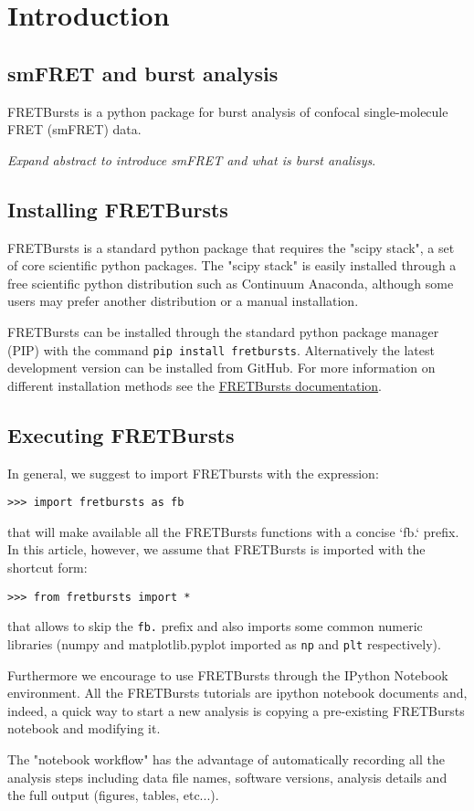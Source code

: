 \section{Introduction}

\subsection{smFRET and burst analysis}

FRETBursts is a python package for burst analysis of confocal single-molecule FRET 
(smFRET) data.

\textit{Expand abstract to introduce smFRET and what is burst analisys}.

\subsection{Installing FRETBursts}
FRETBursts is a standard python package that requires the "scipy stack", a set of core 
scientific python packages.
The "scipy stack" is easily installed through a free scientific python distribution such as Continuum Anaconda, although some users may prefer another distribution or a manual installation.

FRETBursts can be installed through the standard python package manager (PIP) with 
the command \texttt{pip install fretbursts}. Alternatively the latest development version can be installed from GitHub.
For more information on different installation methods see the \href{http://fretbursts.readthedocs.org/en/latest/installation.html}{FRETBursts documentation}.

\subsection{Executing FRETBursts}
In general, we suggest to import FRETbursts with the expression:

\begin{verbatim}
>>> import fretbursts as fb
\end{verbatim}

that will make available all the FRETBursts functions with a concise `fb.` prefix. In this article, however, we assume that FRETBursts is imported with the shortcut form:

\begin{verbatim}
>>> from fretbursts import *
\end{verbatim}

that allows to skip the \verb|fb.| prefix and also imports some common numeric libraries (numpy and matplotlib.pyplot imported as \verb|np| and \verb|plt| respectively).

Furthermore we encourage to use FRETBursts through the IPython Notebook environment. All the FRETBursts tutorials are ipython notebook documents and, indeed, a quick way to start a new analysis is copying a pre-existing FRETBursts notebook and modifying it.

The "notebook workflow"\cite{Shen_2014} has the advantage of automatically recording all the analysis steps including
data file names, software versions, analysis details and the full output (figures, tables, etc...).


